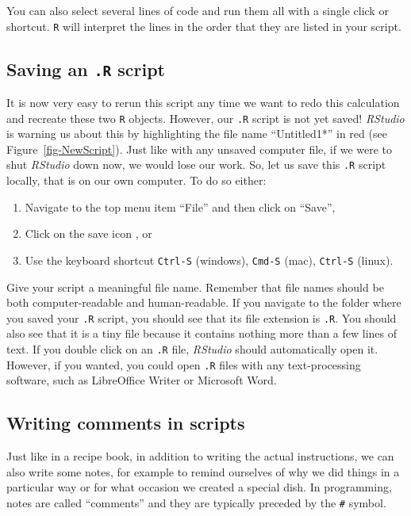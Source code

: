 \documentclass[
  letterpaper,
  DIV=11,
  numbers=noendperiod]{scrreprt}
\providecommand{\tightlist}{%
  \setlength{\itemsep}{0pt}\setlength{\parskip}{0pt}}
\begin{document}
You can also select several lines of code and run them all with a single
click or shortcut. \texttt{R} will interpret the lines in the order that
they are listed in your script.

\subsection{\texorpdfstring{Saving an \texttt{.R}
script}{Saving an .R script}}\label{sec-SavingRScripts}

It is now very easy to rerun this script any time we want to redo this
calculation and recreate these two \texttt{R} objects. However, our
\texttt{.R} script is not yet saved! \emph{RStudio} is warning us about
this by highlighting the file name ``Untitled1*'' in red (see
Figure~\ref{fig-NewScript}). Just like with any unsaved computer file,
if we were to shut \emph{RStudio} down now, we would lose our work. So,
let us save this \texttt{.R} script locally, that is on our own
computer. To do so either:

\begin{enumerate}
\def\labelenumi{\arabic{enumi}.}
\tightlist
\item
  Navigate to the top menu item ``File'' and then click on ``Save'',
\item
  Click on the save icon , or
\item
  Use the keyboard shortcut
  \texttt{Ctrl-S} (windows), \texttt{Cmd-S} (mac), \texttt{Ctrl-S} (linux).
\end{enumerate}

Give your script a meaningful file name. Remember that file names should
be both computer-readable and human-readable. If you navigate to the
folder where you saved your \texttt{.R} script, you should see that its
file extension is \texttt{.R}. You should also see that it is a tiny
file because it contains nothing more than a few lines of text. If you
double click on an \texttt{.R} file, \emph{RStudio} should automatically
open it. However, if you wanted, you could open \texttt{.R} files with
any text-processing software, such as LibreOffice Writer or Microsoft
Word.

\subsection{Writing comments in scripts}\label{sec-Comments}

Just like in a recipe book, in addition to writing the actual
instructions, we can also write some notes, for example to remind
ourselves of why we did things in a particular way or for what occasion
we created a special dish. In programming, notes are called ``comments''
and they are typically preceded by the \texttt{\#} symbol.
\end{document}
